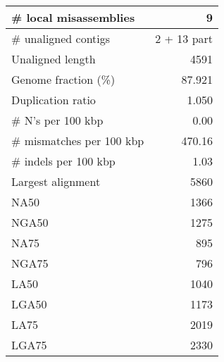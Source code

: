\documentclass[12pt,a4paper]{article}
\begin{document}
\begin{table}[ht]
\begin{center}
\begin{tabular}{|l*{1}{|r}|}
\# local misassemblies & 9 \\ \hline
\# unaligned contigs & 2 + 13 part \\ \hline
Unaligned length & 4591 \\ \hline
Genome fraction (\%) & 87.921 \\ \hline
Duplication ratio & 1.050 \\ \hline
\# N's per 100 kbp & 0.00 \\ \hline
\# mismatches per 100 kbp & 470.16 \\ \hline
\# indels per 100 kbp & 1.03 \\ \hline
Largest alignment & 5860 \\ \hline
NA50 & 1366 \\ \hline
NGA50 & 1275 \\ \hline
NA75 & 895 \\ \hline
NGA75 & 796 \\ \hline
LA50 & 1040 \\ \hline
LGA50 & 1173 \\ \hline
LA75 & 2019 \\ \hline
LGA75 & 2330 \\ \hline
\end{tabular}
\end{center}
\end{table}
\end{document}
